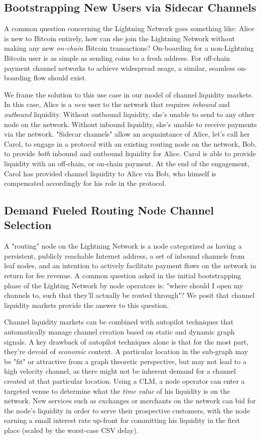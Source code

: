 \documentclass[10pt,a4paper]{article}
\theoremstyle{definition}
\begin{document}
\subsection{Bootstrapping New Users via Sidecar Channels}

A common question concerning the Lightning Network goes something like: Alice
is new to Bitcoin entirely, how can she join the Lightning Network without
making any new \emph{on-chain} Bitcoin transactions? On-boarding for a
non-Lightning Bitcoin user is as simple as sending coins to a fresh address.
For off-chain payment channel networks to achieve widespread usage, a similar,
seamless on-boarding flow should exist.

We frame the solution to this use case in our model of channel liquidity
markets. In this case, Alice is a \emph{new} user to the network that requires
\emph{inbound} and \emph{outbound} liquidity. Without outbound liquidity, she's
unable to send to any other node on the network. Without inbound liquidity,
she's unable to receive payments via the network. "Sidecar channels" allow an
acquaintance of Alice, let's call her Carol, to engage in a protocol with an
existing routing node on the network, Bob, to provide \emph{both} inbound and
outbound liquidity for Alice. Carol is able to provide liquidity with an
off-chain, or on-chain payment. At the end of the engagement, Carol has
provided channel liquidity to Alice via Bob, who himself is compensated
accordingly for his role in the protocol.

\subsection{Demand Fueled Routing Node Channel Selection}

A "routing" node on the Lightning Network is a node categorized as having a
persistent, publicly reachable Internet address, a set of inbound channels from
leaf nodes, and an intention to actively facilitate payment flows on the
network in return for fee revenue. A common question asked in the initial
bootstrapping phase of the Lighting Network by node operators is: "where should
I open my channels to, such that they'll actually be routed through"? We posit
that channel liquidity markets provide the answer to this question.

Channel liquidity markets can be combined with autopilot \cite{autopilot}
techniques that automatically manage channel creation based on static and
dynamic graph signals. A key drawback of autopilot techniques alone is that for
the most part, they're devoid of \emph{economic} context. A particular location
in the sub-graph may be "fit" or attractive from a graph theoretic perspective,
but may not lead to a high velocity channel, as there might not be inherent
demand for a channel created at that particular location. Using a CLM, a node
operator can enter a targeted venue to determine what the \emph{time value} of
his liquidity is on the network. New services such as exchanges or merchants on
the network can bid for the node's liquidity in order to serve their
prospective customers, with the node earning a small interest rate up-front for
committing his liquidity in the first place (scaled by the worst-case CSV
delay).
\end{document}
